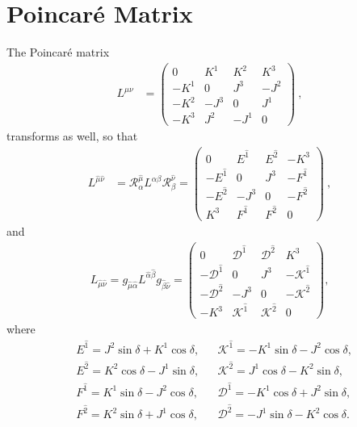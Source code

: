 \documentclass[12pt,a4paper]{report}
\newcommand{\muT}{\hat{\mu}}
\newcommand{\nuT}{\hat{\nu}}
\newcommand{\itP}[1]{\hat{#1}}
\begin{document}
\section{Poincaré Matrix}
The Poincar\'e matrix \cite{poin, gauge}
\begin{align}\label{eqn:J_mu_nu_IF}
  L^{\mu\nu}&=
  \begin{pmatrix}
    0 & K^{1} & K^{2} & K^{3}\\
    -K^{1} & 0 & J^{3} & -J^{2}\\
    -K^{2} & -J^{3} & 0 & J^{1}\\
    -K^{3} & J^{2} & -J^{1} & 0
  \end{pmatrix}~,
\end{align}
transforms as well, so that
\begin{align}\label{eqn:Poincare_Matrix_Interpolation_superscripts}
  L^{\muT\nuT}
  &=
  \mathcal{R}^{\muT}_{\alpha}L^{\alpha\beta}\mathcal{R}^{\nuT}_{\beta}
  =
  \begin{pmatrix}
    0 & {E}^{\itP{1}} & {E}^{\itP{2}} & -{K}^{3}\\
    -{E}^{\itP{1}} & 0 & {J}^{3} & -{F}^{\itP{1}}\\
    -{E}^{\itP{2}} & -{J}^{3} & 0 & -{F}^{\itP{2}}\\
    {K}^{3} & {F}^{\itP{1}} & {F}^{\itP{2}} & 0
  \end{pmatrix}~,
\end{align}
and
\begin{align}\label{eqn:Poincare_Matrix_Interpolation_subscripts}
  L_{\muT\nuT}
  =
  g_{\muT\itP{\alpha}}L^{\itP{\alpha}\itP{\beta}}g_{\itP{\beta}\nuT}
  =
  \begin{pmatrix}
    0 & {\mathcal{D}}^{\itP{1}} & {\mathcal{D}}^{\itP{2}} & {K}^{3}\\
    -{\mathcal{D}}^{\itP{1}} & 0 & {J}^{3} & -{\mathcal{K}}^{\itP{1}}\\
    -{\mathcal{D}}^{\itP{2}} & -{J}^{3} & 0 & -{\mathcal{K}}^{\itP{2}}\\
    -{K}^{3} & {\mathcal{K}}^{\itP{1}} & {\mathcal{K}}^{\itP{2}} & 0
  \end{pmatrix},
\end{align}
where
\begin{align}\label{eqn:E_F_D_K_Definition_Interpolation_Angle}
  &E^{\itP{1}}=J^{2}\sin\delta+K^{1}\cos\delta,
  &&\mathcal{K}^{\itP{1}}=-K^{1}\sin\delta-J^{2}\cos\delta, \nonumber\\
  &E^{\itP{2}}=K^{2}\cos\delta-J^{1}\sin\delta,
  &&\mathcal{K}^{\itP{2}}=J^{1}\cos\delta-K^{2}\sin\delta, \nonumber\\
  &F^{\itP{1}}=K^{1}\sin\delta-J^{2}\cos\delta,
  &&\mathcal{D}^{\itP{1}}=-K^{1}\cos\delta+J^{2}\sin\delta, \nonumber\\
  &F^{\itP{2}}=K^{2}\sin\delta+J^{1}\cos\delta,
  &&\mathcal{D}^{\itP{2}}=-J^{1}\sin\delta-K^{2}\cos\delta.
\end{align}
\end{document}
